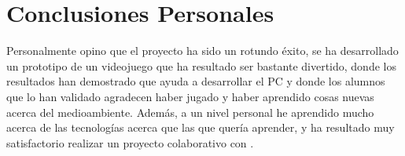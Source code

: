\section{Conclusiones Personales}

Personalmente opino que el proyecto ha sido un rotundo éxito, se ha desarrollado un prototipo de un videojuego que ha resultado ser bastante divertido, donde los resultados han demostrado que ayuda a desarrollar el PC y donde los alumnos que lo han validado agradecen haber jugado y haber aprendido cosas nuevas acerca del medioambiente. Además, a un nivel personal he aprendido mucho acerca de las tecnologías acerca que las que quería aprender, y ha resultado muy satisfactorio realizar un proyecto colaborativo con \nombrecoautor. 